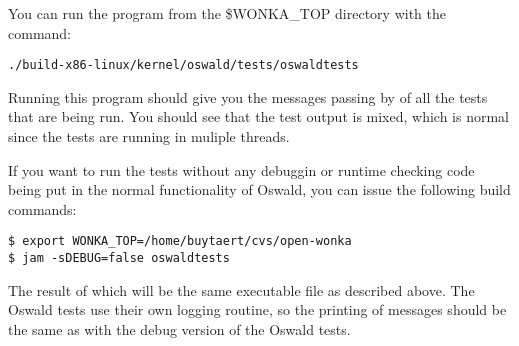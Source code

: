 You can run the program from the \textsf{\$WONKA\_TOP} directory with the
command:

\begin{verbatim}
./build-x86-linux/kernel/oswald/tests/oswaldtests
\end{verbatim}

Running this program should give you the messages passing by of all the
tests that are being run. You should see that the test output is mixed,
which is normal since the tests are running in muliple threads.

If you want to run the tests without any debuggin or runtime checking code
being put in the normal functionality of Oswald, you can issue the following
build commands:

\begin{verbatim}
$ export WONKA_TOP=/home/buytaert/cvs/open-wonka
$ jam -sDEBUG=false oswaldtests
\end{verbatim}

The result of which will be the same executable file as described above. The
Oswald tests use their own logging routine, so the printing of messages
should be the same as with the debug version of the Oswald tests.

